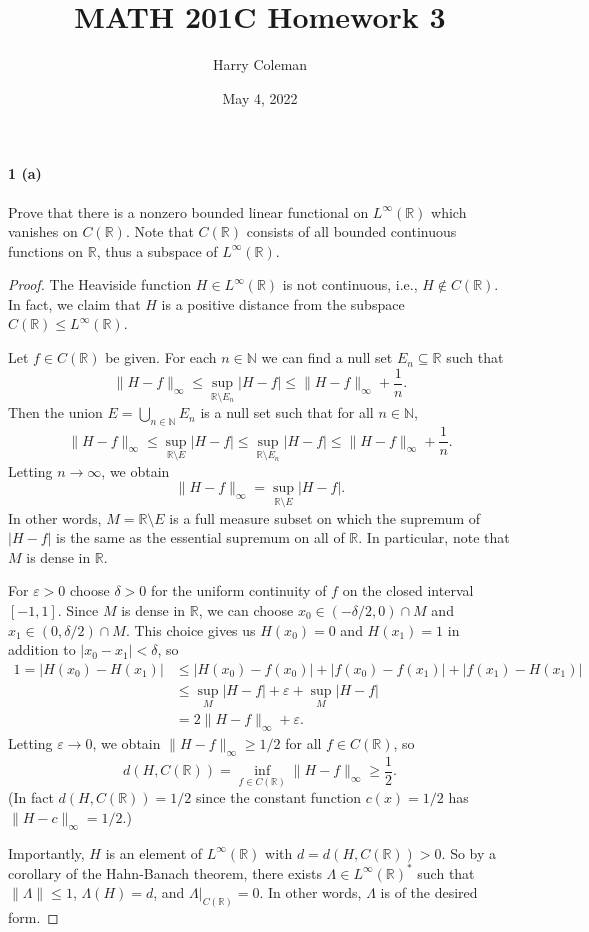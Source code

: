 \documentclass[12pt]{article}
\renewcommand{\maketitle}{\thispagestyle{title}}
\newlength{\myparskip}
\newenvironment{fullbox}{\begin{lrbox}{\savefullbox}\begin{minipage}{\dimexpr\textwidth-2\fboxsep\relax}\setlength{\parskip}{\myparskip}}{\end{minipage}\end{lrbox}\framebox[\textwidth]{\usebox{\savefullbox}}}
\newenvironment{pbox}[1][]{\begin{fullbox}\def\temp{#1}\ifx\temp\empty\else\paragraph{#1}\phantom{}\fi}{\end{fullbox}}
\theoremstyle{definition}
\newcommand{\N}{\mathbb{N}}
\newcommand{\R}{\mathbb{R}}
\newcommand{\eps}{\varepsilon}
\newcommand{\<}{\langle}
\renewcommand{\>}{\rangle}
\newcommand{\seq}{\subseteq}
\begin{document}
\title{MATH 201C Homework 3}
\author{Harry Coleman}
\date{May 4, 2022}
\maketitle

\begin{pbox}[1 (a)]
    Prove that there is a nonzero bounded linear functional on $L^\infty(\R)$ which vanishes on $C(\R)$.
    Note that $C(\R)$ consists of all bounded continuous functions on $\R$, thus a subspace of $L^\infty(\R)$.
\end{pbox}

\begin{proof}
    The Heaviside function $H \in L^\infty(\R)$ is not continuous, i.e., $H \notin C(\R)$.
    In fact, we claim that $H$ is a positive distance from the subspace $C(\R) \leq L^\infty(\R)$.

    Let $f \in C(\R)$ be given.
    For each $n \in \N$ we can find a null set $E_n \seq \R$ such that
    \[
        \|H - f\|_\infty
            \leq \sup_{\R \setminus E_n} |H - f|
            \leq \|H - f\|_\infty + \frac{1}{n}.
    \]
    Then the union $E = \bigcup_{n \in \N} E_n$ is a null set such that for all $n \in \N$,
    \[
        \|H - f\|_\infty
            \leq \sup_{\R \setminus E} |H - f|
            \leq \sup_{\R \setminus E_n} |H - f|
            \leq \|H - f\|_\infty + \frac{1}{n}.
    \]
    Letting $n \to \infty$, we obtain
    \[
        \|H - f\|_\infty = \sup_{\R \setminus E} |H - f|.
    \]
    In other words, $M = \R \setminus E$ is a full measure subset on which the supremum of $|H - f|$ is the same as the essential supremum on all of $\R$.
    In particular, note that $M$ is dense in $\R$.
    
    For $\eps > 0$ choose $\delta > 0$ for the uniform continuity of $f$ on the closed interval $[-1, 1]$.
    Since $M$ is dense in $\R$, we can choose $x_0 \in (-\delta/2, 0) \cap M$ and $x_1 \in (0, \delta/2) \cap M$.
    This choice gives us $H(x_0) = 0$ and $H(x_1) = 1$ in addition to $|x_0 - x_1| < \delta$, so
    \begin{align*}
        1 = |H(x_0) - H(x_1)|
            &\leq |H(x_0) - f(x_0)| + |f(x_0) - f(x_1)| + |f(x_1) - H(x_1)|
        \\[1ex]
            &\leq \sup_{M}|H - f| + \eps + \sup_{M}|H - f| \\
            &= 2\|H - f\|_\infty + \eps.
    \end{align*}
    Letting $\eps \to 0$, we obtain $\|H - f\|_\infty \geq 1/2$ for all $f \in C(\R)$, so
    \[
        d(H, C(\R))
            = \inf_{f \in C(\R)} \|H - f\|_\infty
            \geq \frac{1}{2}.
    \]
    (In fact $d(H, C(\R)) = 1/2$ since the constant function $c(x) = 1/2$ has $\|H - c\|_\infty = 1/2$.)

    Importantly, $H$ is an element of $L^\infty(\R)$ with $d = d(H, C(\R)) > 0$.
    So by a corollary of the Hahn-Banach theorem, there exists $\Lambda \in L^\infty(\R)^*$ such that $\|\Lambda\| \leq 1$, $\Lambda(H) = d$, and $\Lambda|_{C(\R)} = 0$.
    In other words, $\Lambda$ is of the desired form.
\end{proof}
\end{document}
